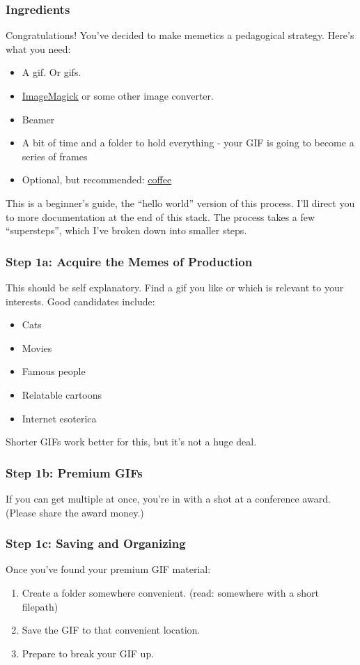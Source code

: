 \documentclass{beamer}
\begin{document}
\begin{frame}
	\frametitle{Ingredients}
	Congratulations! You've decided to make memetics a pedagogical strategy. Here's what you need:
		\begin{itemize}
			\item A gif. Or gifs.
			\item \href{https://www.imagemagick.org/script/binary-releases.php}{ImageMagick} or some other image converter.
			\item Beamer
			\item A bit of time and a folder to hold everything - your GIF is going to become a series of frames
			\item Optional, but recommended: \href{https://www.roosroast.com/}{coffee}
		\end{itemize}
	This is a beginner's guide, the ``hello world'' version of this process. I'll direct you to more documentation at the end of this stack. The process takes a few ``supersteps'', which I've broken down into smaller steps.
\end{frame}

\begin{frame}
	\frametitle{Step 1a: Acquire the Memes of Production}
	This should be self explanatory. Find a gif you like or which is relevant to your interests. Good candidates include:
		\begin{itemize}
			\item Cats
			\item Movies
			\item Famous people
			\item Relatable cartoons
			\item Internet esoterica
		\end{itemize}
	Shorter GIFs work better for this, but it's not a huge deal.
\end{frame}

\begin{frame}
	\frametitle{Step 1b: Premium GIFs}
	If you can get multiple at once, you're in with a shot at a conference award. (Please share the award money.)
	\begin{center}
	\end{center}
	\end{frame}

\begin{frame}
	\frametitle{Step 1c: Saving and Organizing}
	Once you've found your premium GIF material:
		\begin{enumerate}
			\item Create a folder somewhere convenient. (read: somewhere with a short filepath)
			\item Save the GIF to that convenient location.
			\item Prepare to break your GIF up.
		\end{enumerate}
\end{frame}
\end{document}
